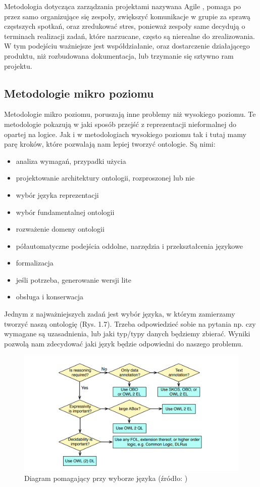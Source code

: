 \documentclass[a4paper,12pt, twoside]{book} %
\begin{document}
 Metodologia dotycząca zarządzania projektami nazywana Agile \cite{agile}, pomaga po przez samo organizujące się zespoły, zwiększyć komunikacje w grupie za sprawą częstszych spotkań, oraz zredukować stres, ponieważ zespoły same decydują o terminach realizacji zadań, które narzucane, często są nierealne do zrealizowania. W tym podejściu ważniejsze jest współdziałanie, oraz dostarczenie działającego produktu, niż rozbudowana dokumentacja, lub trzymanie się sztywno ram projektu.

\subsection{Metodologie mikro poziomu}
Metodologie mikro poziomu, poruszają inne problemy niż wysokiego poziomu. Te metodologie pokazują w jaki sposób przejść z reprezentacji nieformalnej do opartej na logice. Jak i w metodologiach wysokiego poziomu tak i tutaj mamy parę kroków, które pozwalają nam lepiej tworzyć ontologie. Są nimi:
\begin{itemize}
	\item analiza wymagań, przypadki użycia
	\item projektowanie architektury ontologii, rozproszonej lub nie
	\item wybór języka reprezentacji
	\item wybór fundamentalnej ontologii
	\item rozważenie domeny ontologii
	\item półautomatyczne podejścia oddolne, narzędzia i przekształcenia językowe
	\item formalizacja
	\item jeśli potrzeba, generowanie wersji lite
	\item obsługa i konserwacja
\end{itemize}
Jednym z najważniejszych zadań jest wybór języka, w którym zamierzamy tworzyć naszą ontologię (Rys. 1.7). Trzeba odpowiedzieć sobie na pytania np. czy wymagane są uzasadnienia, lub jaki typ/typy danych będziemy zbierać. Wyniki pozwolą nam zdecydować jaki język będzie odpowiedni do naszego problemu.
\begin{figure}[h]
	\centering
	\includegraphics[scale=0.55]{lang.png}
	\caption{Diagram pomagający przy wyborze języka (źródło: \cite{lang})}
\end{figure}
\end{document}

